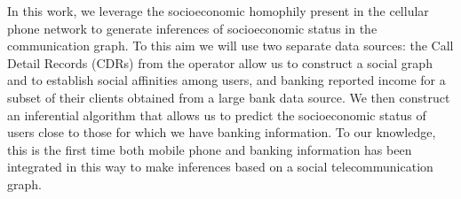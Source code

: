 In this work, we leverage the socioeconomic homophily present in the cellular phone network to generate inferences of socioeconomic status in the communication graph. To this aim we will use two separate data sources: the Call Detail Records (CDRs) from the operator allow us to construct a social graph and to establish social affinities among users, and banking reported income for a subset of their clients obtained from a large bank data source. We then construct an inferential algorithm that allows us to predict the socioeconomic status of users close to those for which we have banking information. To our knowledge, this is the first time both mobile phone and banking information has been integrated in this way to make inferences based on a social telecommunication graph.
